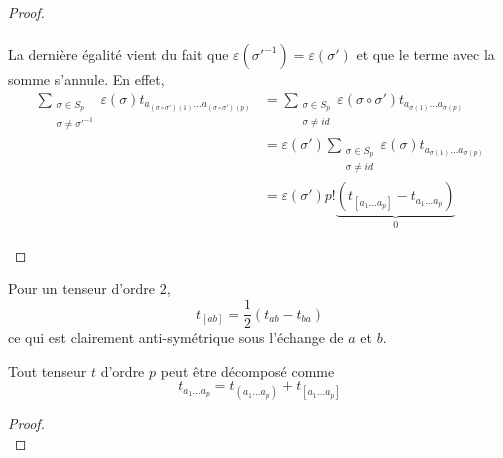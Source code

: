 \documentclass[a4paper,11pt]{report}
\begin{document}
\begin{proof}
\begin{enumerate}[label = \textit{\roman*)}]
\begin{align}
                        \end{align}
                        La dernière égalité vient du fait que $ \varepsilon(\sigma'^{-1}) =  \varepsilon(\sigma')$ et que le terme avec la somme s'annule. En effet,
                        \begin{align}
                            \sum_{\substack{\sigma\in S_p\\\sigma\neq\sigma'^{-1}}} \varepsilon(\sigma) t_{a_{(\sigma\circ\sigma')(1)}\dots a_{(\sigma\circ\sigma')(p)}} 
                            &= \sum_{\substack{\sigma\in S_p\\\sigma\neq id}} \varepsilon(\sigma\circ\sigma') t_{a_{\sigma(1)}\dots a_{\sigma(p)}} \\
                            &= \varepsilon(\sigma')\sum_{\substack{\sigma\in S_p\\\sigma\neq id}} \varepsilon(\sigma) t_{a_{\sigma(1)}\dots a_{\sigma(p)}}\\
                            &= \varepsilon(\sigma') p!\underbrace{\left( t_{[a_1\dots a_p]}-t_{a_1\dots a_p} \right)}_{0}
                        \end{align}
                    \end{enumerate}
                \end{proof}
                
                \begin{exmp}
                    Pour un tenseur d'ordre $2$,
                    \begin{equation}
                        t_{[ab]} = \frac{1}{2}(t_{ab}-t_{ba})
                    \end{equation}
                    ce qui est clairement anti-symétrique sous l'échange de $a$ et $b$. 
                \end{exmp}
                
                \begin{prop}\begin{leftbar}
                    Tout tenseur $t$ d'ordre $p$ peut être décomposé comme
                    \begin{equation}
                        t_{a_1\dots a_p} = t_{(a_1\dots a_p)} + t_{[a_1\dots a_p]}
                    \end{equation}
                \end{leftbar}\end{prop}
                
                \begin{proof}${}$\\
                    \comp
                \end{proof}
                
\end{document}
